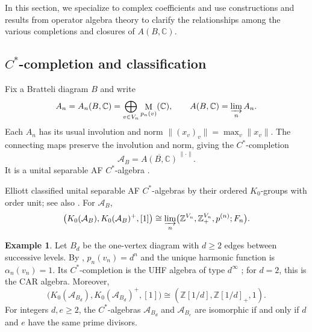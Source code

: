 \documentclass[11pt]{amsart}
\DeclareMathOperator{\Mat}{M}
\theoremstyle{definition}
\newtheorem{example}[theorem]{Example}
\theoremstyle{remark}
\begin{document}
In this section, we specialize to complex coefficients and use
constructions and results from operator algebra theory to clarify
the relationships among the various completions and closures of
$A(B,\mathbb C)$.

\subsection{\texorpdfstring{$C^*$}{C*}-completion and classification}
\label{subsec:af-dimension-traces}

Fix a Bratteli diagram $B$ and write
\[
 A_n=A_n(B,\mathbb C)
 =\bigoplus_{v\in V_n}\Mat_{p_n(v)}(\mathbb C),\qquad
 A(B,\mathbb C)=\varinjlim_n A_n.
\]
Each $A_n$ has its usual involution and norm
$\|(x_v)_v\|=\max_v\|x_v\|$.  The connecting maps preserve
the involution and norm, giving the $C^*$-completion
\[
 \mathcal A_B=\overline{A(B,\mathbb C)}^{\,\|\cdot\|}.
\]
It is a unital separable AF $C^*$-algebra \cite{Bratteli1972}.

Elliott \cite{Elliott1976} classified unital separable AF $C^*$-algebras
by their ordered $K_0$-groups with order unit; see also \cite{Effros1981}.  For $\mathcal A_B$,
\begin{equation}\label{eq:af-dimension-group}
 \bigl(K_0(\mathcal A_B),K_0(\mathcal A_B)^+,[1]\bigr)
 \cong\varinjlim_n
 \bigl(\mathbb Z^{V_n},\mathbb Z_+^{V_n},p^{(n)};F_n\bigr).
\end{equation}

\begin{example}\label{ex:uhf-classification}
Let $B_d$ be the one-vertex diagram with $d\geq2$ edges between
successive levels.  By ,
$p_n(v_n)=d^n$ and the unique harmonic function is $\alpha_n(v_n)=1$.
Its $C^*$-completion is the UHF algebra of type $d^\infty$
\cite{Glimm1960}; for $d=2$, this is the CAR algebra.  Moreover,
\[
 \bigl(K_0(\mathcal A_{B_d}),K_0(\mathcal A_{B_d})^+,[1]\bigr)
 \cong(\mathbb Z[1/d],\mathbb Z[1/d]_+,1).
\]
For integers $d,e\geq2$, the $C^*$-algebras $\mathcal A_{B_d}$
and $\mathcal A_{B_e}$ are isomorphic if and only if $d$ and $e$
have the same prime divisors.
\end{example}
\end{document}
